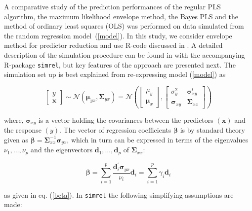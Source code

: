 \documentclass[num-refs]{wiley-article}
\begin{document}
A comparative study of the prediction performances of the regular PLS algorithm,
the maximum likelihood envelope method, the Bayes PLS and the method of ordinary least squares (OLS) was performed on data simulated from the random regression model~(\ref{model}). In this study, we consider envelope method for predictor reduction \citep{cook2013envelopes} and use R-code discussed in \citet{cook2016note}. A detailed description of the simulation procedure can be found in \citep{saebo2015simrel} with the accompanying R-package {\tt simrel}, but key features of the approach are presented next. The simulation set up is best explained from re-expressing model (\ref{model}) as

\begin{equation}
  \label{eq:rand-reg-model}
  \begin{bmatrix}
    y \\ \mathbf{x}
  \end{bmatrix} \sim
  \mathcal{N}\left( \boldsymbol{\mu}_{yx}, \boldsymbol{\Sigma}_{yx} \right) =
  \mathcal{N}\left(
    \begin{bmatrix}
      \mu_y \\ \boldsymbol{\mu}_x
    \end{bmatrix},
    \begin{bmatrix}
      \sigma_y^2               & \boldsymbol{\sigma}_{xy}^t \\
      \boldsymbol{\sigma}_{xy} & \boldsymbol{\Sigma}_{xx}
    \end{bmatrix}
  \right)
\end{equation}

where, $\boldsymbol{\sigma}_{xy}$ is a vector holding the covariances between the predictors $(\mathbf{x})$ and the response $(y)$. The vector of regression coefficients  $\boldsymbol{\beta}$ is by standard theory given as $\boldsymbol{\beta} = \boldsymbol{\Sigma}_{xx}^{-1}\boldsymbol{\sigma}_{yx}$, which in turn can be expressed in terms of the eigenvalues $\nu_1, \ldots, \nu_p$ and the eigenvectors $\bm{d}_1, \ldots, \bm{d}_p$ of $\boldsymbol{\Sigma}_{xx}$:

\begin{equation}
  \boldsymbol{\beta} = \sum_{i=1}^p \frac{\boldsymbol{d}_i^{'}\boldsymbol{\sigma}_{yx}}{\nu_i}\boldsymbol{d}_i = \sum_{i=1}^p\gamma_i \boldsymbol{d}_i
\end{equation}

as given in eq. (\ref{beta}). In {\tt simrel} the following simplifying assumptions are made:
\end{document}
